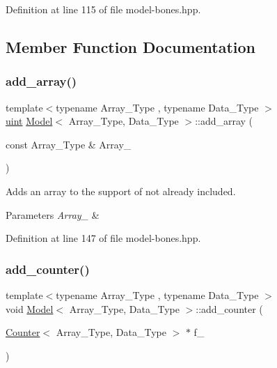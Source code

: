 Definition at line 115 of file model-\/bones.\+hpp.



\subsection{Member Function Documentation}
\mbox{\label{class_model_a9f66c7c39acb51cd49658ebd1c5999d4}} 
\subsubsection{\texorpdfstring{add\+\_\+array()}{add\_array()}}
{\footnotesize\ttfamily template$<$typename Array\+\_\+\+Type , typename Data\+\_\+\+Type $>$ \\
\hyperlink{typedefs_8hpp_a91ad9478d81a7aaf2593e8d9c3d06a14}{uint} \hyperlink{class_model}{Model}$<$ Array\+\_\+\+Type, Data\+\_\+\+Type $>$\+::add\+\_\+array (\begin{DoxyParamCaption}\item[{const Array\+\_\+\+Type \&}]{Array\+\_\+ }\end{DoxyParamCaption})\hspace{0.3cm}{\ttfamily [inline]}}



Adds an array to the support of not already included. 


\begin{DoxyParams}{Parameters}
{\em Array\+\_\+} & \\
\hline
\end{DoxyParams}


Definition at line 147 of file model-\/bones.\+hpp.

\mbox{\label{class_model_a4cf4d6fc6cf43d598fa6195c25f5cca5}} 
\subsubsection{\texorpdfstring{add\+\_\+counter()}{add\_counter()}}
{\footnotesize\ttfamily template$<$typename Array\+\_\+\+Type , typename Data\+\_\+\+Type $>$ \\
void \hyperlink{class_model}{Model}$<$ Array\+\_\+\+Type, Data\+\_\+\+Type $>$\+::add\+\_\+counter (\begin{DoxyParamCaption}\item[{\hyperlink{class_counter}{Counter}$<$ Array\+\_\+\+Type, Data\+\_\+\+Type $>$ $\ast$}]{f\+\_\+ }\end{DoxyParamCaption})\hspace{0.3cm}{\ttfamily [inline]}}



